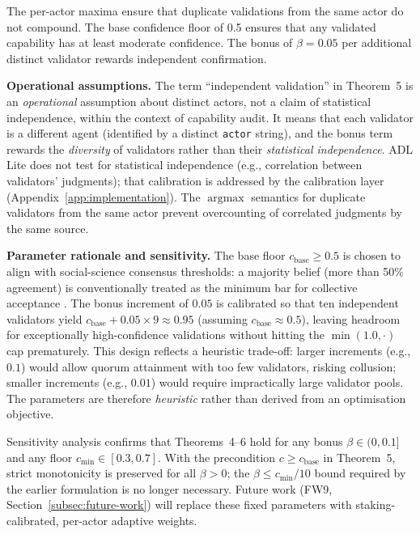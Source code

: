 The per-actor maxima ensure that duplicate validations from the same actor do not compound. The base confidence floor of 0.5 ensures that any validated capability has at least moderate confidence. The bonus of $\beta = 0.05$ per additional distinct validator rewards independent confirmation.

\textbf{Operational assumptions.} The term ``independent validation'' in Theorem~5 is an \emph{operational} assumption about distinct actors, not a claim of statistical independence, within the context of capability audit. It means that each validator is a different agent (identified by a distinct \texttt{actor} string), and the bonus term rewards the \emph{diversity} of validators rather than their \emph{statistical independence}. ADL Lite does not test for statistical independence (e.g., correlation between validators' judgments); that calibration is addressed by the calibration layer (Appendix~\ref{app:implementation}). The $\operatorname{argmax}$ semantics for duplicate validators from the same actor prevent overcounting of correlated judgments by the same source.

\textbf{Parameter rationale and sensitivity.} The base floor $c_{\text{base}} \geq 0.5$ is chosen to align with social-science consensus thresholds: a majority belief (more than 50\% agreement) is conventionally treated as the minimum bar for collective acceptance \cite{guha2016schemaorg}. The bonus increment of $0.05$ is calibrated so that ten independent validators yield $c_{\text{base}} + 0.05 \times 9 \approx 0.95$ (assuming $c_{\text{base}} \approx 0.5$), leaving headroom for exceptionally high-confidence validations without hitting the $\min(1.0, \cdot)$ cap prematurely. This design reflects a heuristic trade-off: larger increments (e.g., $0.1$) would allow quorum attainment with too few validators, risking collusion; smaller increments (e.g., $0.01$) would require impractically large validator pools. The parameters are therefore \emph{heuristic} rather than derived from an optimisation objective.

Sensitivity analysis confirms that Theorems~4--6 hold for any bonus $\beta \in (0, 0.1]$ and any floor $c_{\text{min}} \in [0.3, 0.7]$. With the precondition $c \geq c_{\text{base}}$ in Theorem~5, strict monotonicity is preserved for all $\beta > 0$; the $\beta \leq c_{\text{min}} / 10$ bound required by the earlier formulation is no longer necessary. Future work (FW9, Section~\ref{subsec:future-work}) will replace these fixed parameters with staking-calibrated, per-actor adaptive weights.

